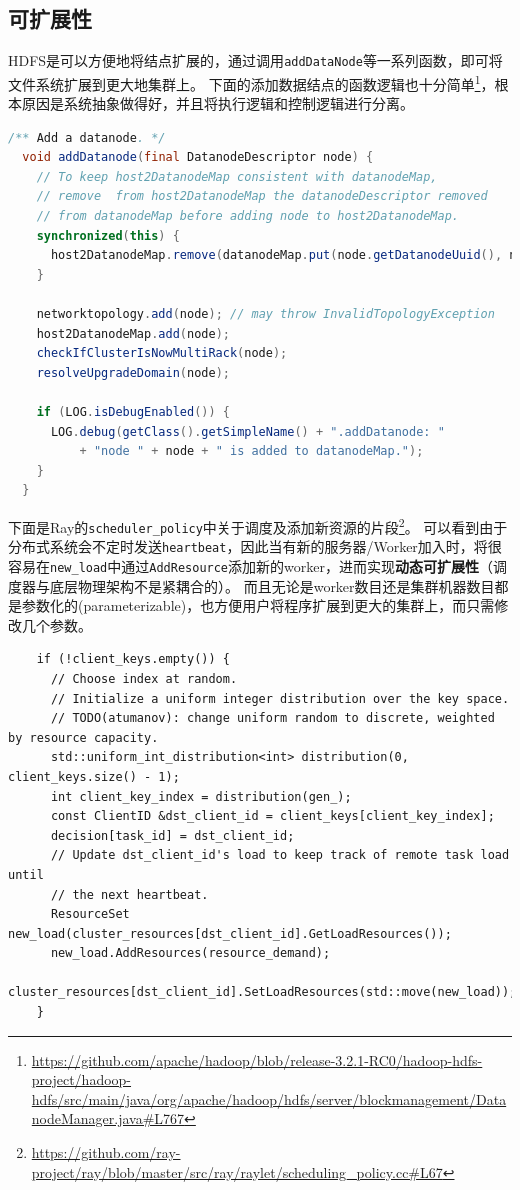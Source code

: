 \documentclass[logo,reportComp]{thesis}
\begin{document}
\subsection{可扩展性}
HDFS是可以方便地将结点扩展的，通过调用\verb'addDataNode'等一系列函数，即可将文件系统扩展到更大地集群上。
下面的添加数据结点的函数逻辑也十分简单\footnote{\url{https://github.com/apache/hadoop/blob/release-3.2.1-RC0/hadoop-hdfs-project/hadoop-hdfs/src/main/java/org/apache/hadoop/hdfs/server/blockmanagement/DatanodeManager.java\#L767}}，根本原因是系统抽象做得好，并且将执行逻辑和控制逻辑进行分离。
\begin{lstlisting}[language=java]
  /** Add a datanode. */
  void addDatanode(final DatanodeDescriptor node) {
    // To keep host2DatanodeMap consistent with datanodeMap,
    // remove  from host2DatanodeMap the datanodeDescriptor removed
    // from datanodeMap before adding node to host2DatanodeMap.
    synchronized(this) {
      host2DatanodeMap.remove(datanodeMap.put(node.getDatanodeUuid(), node));
    }

    networktopology.add(node); // may throw InvalidTopologyException
    host2DatanodeMap.add(node);
    checkIfClusterIsNowMultiRack(node);
    resolveUpgradeDomain(node);

    if (LOG.isDebugEnabled()) {
      LOG.debug(getClass().getSimpleName() + ".addDatanode: "
          + "node " + node + " is added to datanodeMap.");
    }
  }
\end{lstlisting}

下面是Ray的\verb'scheduler_policy'中关于调度及添加新资源的片段\footnote{\url{https://github.com/ray-project/ray/blob/master/src/ray/raylet/scheduling_policy.cc\#L67}}。
可以看到由于分布式系统会不定时发送\verb'heartbeat'，因此当有新的服务器/Worker加入时，将很容易在\verb'new_load'中通过\verb'AddResource'添加新的worker，进而实现\textbf{动态可扩展性}（调度器与底层物理架构不是紧耦合的）。
而且无论是worker数目还是集群机器数目都是参数化的(parameterizable)，也方便用户将程序扩展到更大的集群上，而只需修改几个参数。
\begin{lstlisting}
    if (!client_keys.empty()) {
      // Choose index at random.
      // Initialize a uniform integer distribution over the key space.
      // TODO(atumanov): change uniform random to discrete, weighted by resource capacity.
      std::uniform_int_distribution<int> distribution(0, client_keys.size() - 1);
      int client_key_index = distribution(gen_);
      const ClientID &dst_client_id = client_keys[client_key_index];
      decision[task_id] = dst_client_id;
      // Update dst_client_id's load to keep track of remote task load until
      // the next heartbeat.
      ResourceSet new_load(cluster_resources[dst_client_id].GetLoadResources());
      new_load.AddResources(resource_demand);
      cluster_resources[dst_client_id].SetLoadResources(std::move(new_load));
    }
\end{lstlisting}
\end{document}

